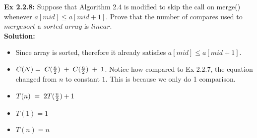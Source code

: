 \documentclass[11pt,fleqn]{article}
\begin{document}
\textbf{Ex 2.2.8:} Suppose that Algorithm 2.4 is modified to skip the call on merge() whenever
$a[mid] \le a[mid+1]$. Prove that the number of compares used to $mergesort$ a $sorted$
$array$ is $linear$.\\

\textbf{Solution:}\\
\begin{itemize}
	\item Since array is sorted, therefore it already satisfies $a[mid] \le a[mid + 1]$.
	\item  $C(N)= \thickspace C(\frac{n}{2}) \thickspace + \thickspace C(\frac{n}{2}) \thickspace + \thickspace 1$. Notice how compared to Ex 2.2.7, the equation changed from $n$ to constant $1$. This is because we only do 1 comparison.
	\item $T(n) \thickspace = \thickspace 2T(\frac{n}{2}) + 1$
	\item $T(1) = 1$
	\item $T(n) = n$
\end{itemize}
\end{document}

